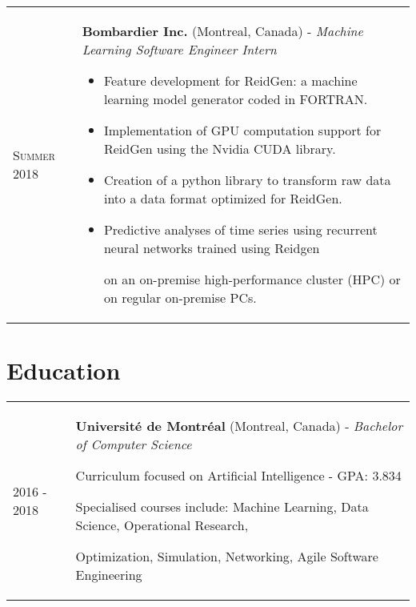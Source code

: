 \documentclass[letterpaper, 10pt]{article}
\begin{document}
\begin{tabular}{p{2.2cm} p{17cm}}

        \textsc{Summer 2018} & 
        {\large \textbf{Bombardier Inc.} (Montreal, Canada) - \textit{Machine Learning Software Engineer Intern}}
        \begin{itemize}[topsep=0.2em]
            \item Feature development for ReidGen: a machine learning model generator coded in FORTRAN.
            \item Implementation of GPU computation support for ReidGen using the Nvidia CUDA library.
            \item Creation of a python library to transform raw data into a data format optimized for ReidGen.
            \item Predictive analyses of time series using recurrent neural networks trained using  Reidgen 
            
            on an on-premise high-performance cluster (HPC) or on regular on-premise PCs.
        \end{itemize}
    \end{tabular}

    \section*{Education}
    \begin{tabular}{p{2.4cm} p{18cm}}	
        2016 - 2018 & {\large \textbf{Université de Montréal} (Montreal, Canada) - \textit{Bachelor of Computer Science}}
        \vspace{0.2em}
        
                \hspace{1em} Curriculum focused on Artificial Intelligence  - GPA: 3.834 
                
                \hspace{1em} Specialised courses include: Machine Learning, Data Science, Operational Research, 
                
                \hspace{1em} Optimization, Simulation, Networking, Agile Software Engineering
    \end{tabular}
\end{document}
